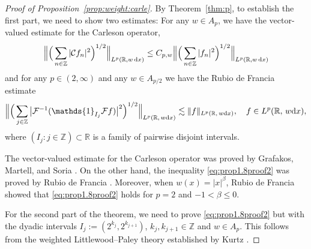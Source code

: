 \documentclass[11pt,oneside]{amsart}
\numberwithin{equation}{section}
\theoremstyle{definition}
\newcommand{\RR}{\mathbb{R}}
\newcommand{\ZZ}{\mathbb{Z}}
\newcommand{\calC}{\mathcal{C}}
\newcommand{\calF}{\mathcal{F}}
\begin{document}
\begin{proof}[Proof of Proposition~\ref{prop:weight:carle}]
By Theorem~\ref{thm:p}, to establish the first part, we need to show two estimates:
For any \( w \in A_p \), we have the vector-valued estimate for the Carleson operator,
\begin{equation}\label{eq:prop1.8proof}
    \Big\|\Big(\sum_{n\in\ZZ}|\calC f_n|^2\Big)^{1/2}\Big\|_{L^p(\RR,w\,{\rm d}x)} \leq C_{p,w} \Big\|\Big(\sum_{n\in\ZZ}|f_n|^2\Big)^{1/2}\Big\|_{L^p(\RR,w\,{\rm d}x)}
\end{equation}
and for any \( p \in (2,\infty) \) and any \( w \in A_{p/2} \) we have the Rubio de Francia estimate
\begin{equation}\label{eq:prop1.8proof2}
\Big\|\Big(\sum_{j\in\ZZ}\big|\calF^{-1}(\mathds{1}_{I_j} \calF f)\big|^2\Big)^{1/2}\Big\|_{L^p(\RR,\,w{\rm d}x)} \lesssim \|f\|_{L^p(\RR,\,w{\rm d}x)}, \quad f \in L^p(\RR,\,w{\rm d}x),
\end{equation}
where $(I_j:j\in\ZZ)\subset\RR$ is a family of pairwise disjoint intervals.

The vector-valued estimate for the Carleson operator was proved by Grafakos, Martell, and Soria \cite{GMS}. On the other hand, the inequality \eqref{eq:prop1.8proof2} was proved by Rubio de Francia \cite{RdF}. Moreover, when \( w(x) = |x|^\beta \), Rubio de Francia \cite[Theorem 4.2]{RdF} showed that \eqref{eq:prop1.8proof2} holds for \( p = 2 \) and \( -1 < \beta \leq 0 \).

For the second part of the theorem, we need to prove \eqref{eq:prop1.8proof2} but with the dyadic intervals \( I_j := (2^{k_j}, 2^{k_{j+1}}) \), \( k_j, k_{j+1} \in \ZZ \) and \( w \in A_p \). This follows from the weighted Littlewood--Paley theory established by Kurtz \cite{Kurtz}.
\end{proof}
\end{document}
